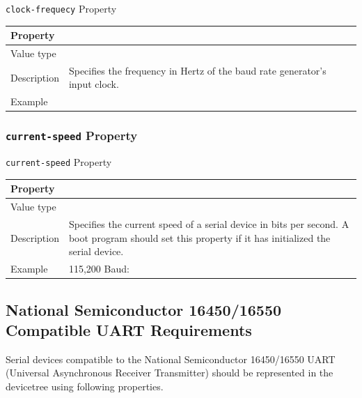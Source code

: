 \documentclass[a4paper,10pt,oneside]{sphinxmanual}
\begin{document}
\begin{threeparttable}
\capstart\caption{\texttt{clock-frequecy} Property}\label{device-bindings:id6}
\begin{tabulary}{\linewidth}{| l J |}
\hline
\textsf{\relax 
Property
} & \textsf{\relax 
{}
}\\
\hline
Value type
 & 
\\
\hline
Description
 & 
Specifies the frequency in Hertz of the baud rate generator's
input clock.
\\
\hline
Example
 & 
\\
\hline\end{tabulary}

\end{threeparttable}



\subsubsection{\texttt{current-speed} Property}
\label{device-bindings:current-speed-property}

\begin{threeparttable}
\capstart\caption{\texttt{current-speed} Property}\label{device-bindings:id7}
\begin{tabulary}{\linewidth}{l J}
\hline
\textsf{\relax 
Property
} & \textsf{\relax 
{}
}\\
\hline
Value type
 & 
\\
\hline
Description
 & 
Specifies the current speed of a serial device in bits per
second. A boot program should set this property if it has
initialized the serial device.
\\
\hline
Example
 & 
115,200 Baud: 
\\
\hline\end{tabulary}

\end{threeparttable}



\subsection{National Semiconductor 16450/16550 Compatible UART Requirements}
\label{device-bindings:national-semiconductor-16450-16550-compatible-uart-requirements}
Serial devices compatible to the National Semiconductor 16450/16550 UART
(Universal Asynchronous Receiver Transmitter) should be represented in
the devicetree using following properties.
\end{document}
